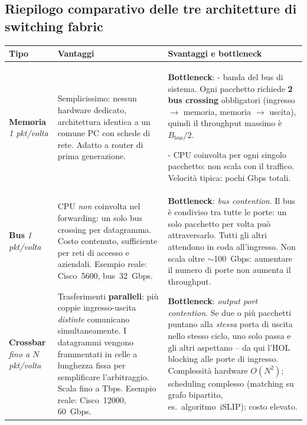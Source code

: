 \documentclass[a4paper,12pt]{report}
\renewcommand{\arraystretch}{1.2}
\begin{document}
\subsection{Riepilogo comparativo delle tre architetture
    di switching fabric}
\begin{tcolorbox}[colback=unibolight, colframe=uniboblue,
    title=\bfseries Riepilogo comparativo delle tre architetture
    di switching fabric, breakable]
\small
\renewcommand{\arraystretch}{1.6}
\begin{tabularx}{\textwidth}{p{2.0cm} X X}
\toprule
\textbf{Tipo}
    & \textbf{Vantaggi}
    & \textbf{Svantaggi e bottleneck} \\
\midrule

\textbf{Memoria}
\newline
{\footnotesize\textit{1 pkt/volta}}
    &
    Semplicissimo: nessun hardware dedicato,
    architettura identica a un comune PC con
    schede di rete.
    Adatto a router di prima generazione.
    &
    \textbf{Bottleneck}:
    - banda del bus di sistema.
    Ogni pacchetto richiede \textbf{2 bus crossing}
    obbligatori (ingresso $\to$ memoria, memoria
    $\to$ uscita), quindi il throughput massimo
    è $B_{\text{bus}}/2$.
    
    - CPU coinvolta per ogni singolo pacchetto:
    non scala con il traffico.
    Velocità tipica: pochi Gbps totali.
    \\

\textbf{Bus}
\newline
{\footnotesize\textit{1 pkt/volta}}
    &
    CPU \emph{non} coinvolta nel forwarding:
    un solo bus crossing per datagramma.
    Costo contenuto, sufficiente per reti
    di accesso e aziendali.
    Esempio reale: Cisco~5600, bus~32~Gbps.
    &
    \textbf{Bottleneck}: \textit{bus contention}.
    Il bus è condiviso tra tutte le porte:
    un solo pacchetto per volta può
    attraversarlo. Tutti gli altri attendono
    in coda all'ingresso.
    Non scala oltre $\sim$100~Gbps:
    aumentare il numero di porte non
    aumenta il throughput.
    \\

\textbf{Crossbar}
\newline
{\footnotesize\textit{fino a $N$ pkt/volta}}
    &
    Trasferimenti \textbf{paralleli}: più
    coppie ingresso-uscita \emph{distinte}
    comunicano simultaneamente.
    I datagrammi vengono frammentati in
    celle a lunghezza fissa per semplificare
    l'arbitraggio.
    Scala fino a Tbps.
    Esempio reale: Cisco~12000, 60~Gbps.
    &
    \textbf{Bottleneck}: \textit{output port contention}.
    Se due o più pacchetti puntano alla
    \emph{stessa} porta di uscita nello
    stesso ciclo, uno solo passa e gli altri
    aspettano -- da qui l'HOL blocking
    alle porte di ingresso.
    Complessità hardware $O(N^2)$;
    scheduling complesso (matching su grafo
    bipartito, es.\ algoritmo~iSLIP);
    costo elevato.
    \\

\bottomrule
\end{tabularx}

\end{tcolorbox}
\end{document}
